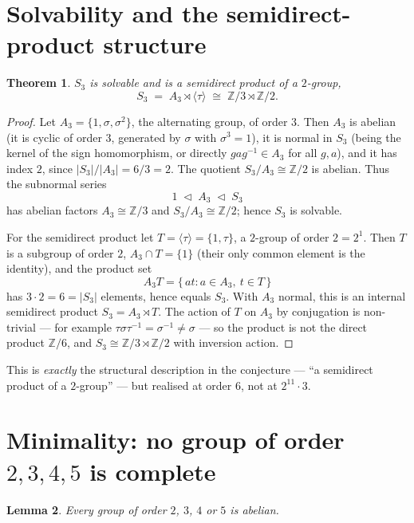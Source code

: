 \documentclass[11pt]{article}
\newtheorem{theorem}{Theorem}
\newtheorem{lemma}[theorem]{Lemma}
\theoremstyle{definition}
\theoremstyle{remark}
\newcommand{\Z}{\mathbb{Z}}
\newcommand{\Zc}[1]{\Z/#1}
\newcommand{\Sthree}{S_3}
\newcommand{\Athree}{A_3}
\begin{document}
\section{Solvability and the semidirect-product structure}

\begin{theorem}\label{thm:solvable}
$\Sthree$ is solvable and is a semidirect product of a $2$-group,
\[
\Sthree \;=\; \Athree \rtimes \langle \tau \rangle \;\cong\; \Zc{3} \rtimes \Zc{2}.
\]
\end{theorem}

\begin{proof}
Let $\Athree = \{1,\sigma,\sigma^2\}$, the alternating group, of order $3$.
Then $\Athree$ is abelian (it is cyclic of order $3$, generated by $\sigma$ with
$\sigma^3 = 1$), it is normal in $\Sthree$ (being the kernel of the sign
homomorphism, or directly $gag^{-1} \in \Athree$ for all $g,a$), and it has
index $2$, since $|\Sthree|/|\Athree| = 6/3 = 2$. The quotient
$\Sthree/\Athree \cong \Zc{2}$ is abelian. Thus the subnormal series
\[
1 \;\triangleleft\; \Athree \;\triangleleft\; \Sthree
\]
has abelian factors $\Athree \cong \Zc{3}$ and $\Sthree/\Athree \cong \Zc{2}$;
hence $\Sthree$ is solvable.

For the semidirect product let $T = \langle \tau \rangle = \{1,\tau\}$, a
$2$-group of order $2 = 2^1$. Then $T$ is a subgroup of order $2$,
$\Athree \cap T = \{1\}$ (their only common element is the identity), and the
product set
\[
\Athree T = \{\, a t : a \in \Athree,\ t \in T \,\}
\]
has $3 \cdot 2 = 6 = |\Sthree|$ elements, hence equals $\Sthree$. With $\Athree$
normal, this is an internal semidirect product $\Sthree = \Athree \rtimes T$. The
action of $T$ on $\Athree$ by conjugation is non-trivial --- for example
$\tau \sigma \tau^{-1} = \sigma^{-1} \neq \sigma$ --- so the product is not the
direct product $\Zc{6}$, and
$\Sthree \cong \Zc{3} \rtimes \Zc{2}$ with inversion action.
\end{proof}

This is \emph{exactly} the structural description in the conjecture --- ``a
semidirect product of a $2$-group'' --- but realised at order $6$, not at
$2^{11}\cdot 3$.

\section{Minimality: no group of order $2, 3, 4, 5$ is complete}

\begin{lemma}\label{lem:small-abelian}
Every group of order $2$, $3$, $4$ or $5$ is abelian.
\end{lemma}
\end{document}
